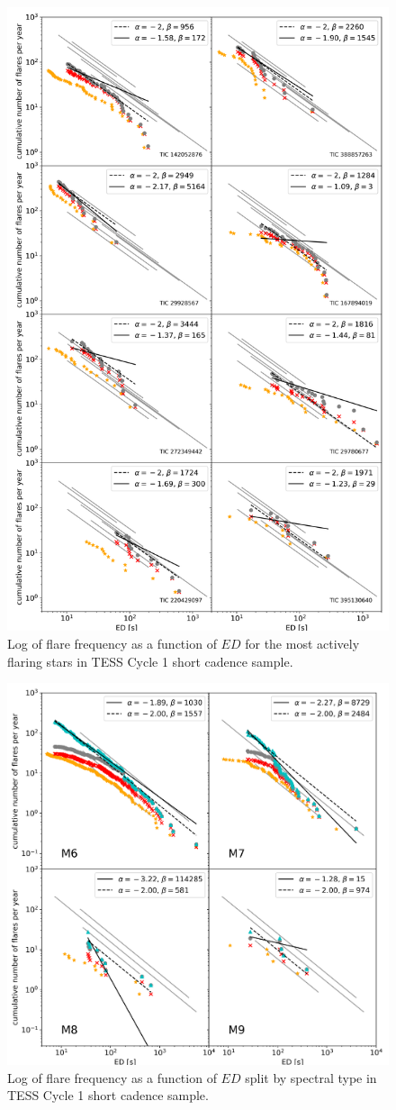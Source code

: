 \documentclass{aastex62}
\begin{document}
\begin{figure}
	\includegraphics[width=.8\columnwidth]{12_03_2020_14_10_individual_target_ffds.png}
    \caption{Log of flare frequency as a function of $ED$ for the most actively flaring stars in TESS Cycle 1 short cadence sample.}
    \label{fig:ffd_indiv_ed}
\end{figure}

\begin{figure}
	\includegraphics[width=.8\columnwidth]{12_03_2020_14_42_spt_ffds.png}
    \caption{Log of flare frequency as a function of $ED$ split by spectral type in TESS Cycle 1 short cadence sample.}
    \label{fig:ffd_spt_ed}
\end{figure}
\end{document}
